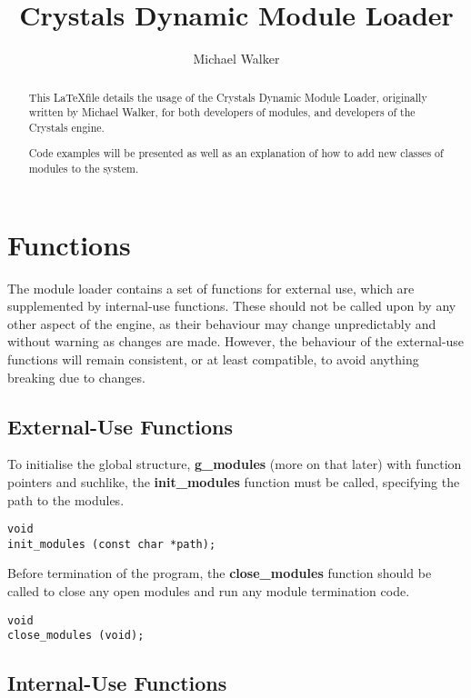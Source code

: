 \documentclass[12pt,a4paper]{article}
\author{Michael Walker}
\title{Crystals Dynamic Module Loader}
\date{}
\begin{document}
\maketitle{}

\begin{abstract}
This \LaTeX file details the usage of the Crystals Dynamic Module Loader, originally written by Michael Walker, for both developers of modules, and developers of the Crystals engine.

Code examples will be presented as well as an explanation of how to add new classes of modules to the system.
\end{abstract}

\section{Functions}

The module loader contains a set of functions for external use, which are supplemented by internal-use functions. These should not be called upon by any other aspect of the engine, as their behaviour may change unpredictably and without warning as changes are made. However, the behaviour of the external-use functions will remain consistent, or at least compatible, to avoid anything breaking due to changes.

\subsection{External-Use Functions}

To initialise the global structure, \textbf{g\_modules} (more on that later) with function pointers and suchlike, the \textbf{init\_modules} function must be called, specifying the path to the modules.

\begin{lstlisting}
void
init_modules (const char *path);
\end{lstlisting}

Before termination of the program, the \textbf{close\_modules} function should be called to close any open modules and run any module termination code.

\begin{lstlisting}
void
close_modules (void);
\end{lstlisting}

\subsection{Internal-Use Functions}
\end{document}
